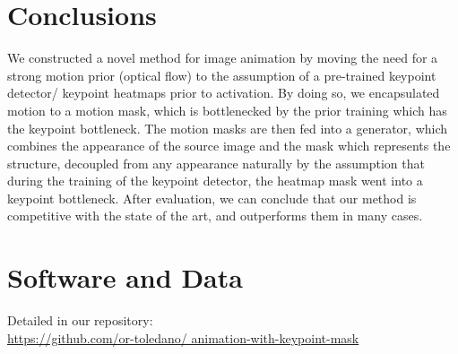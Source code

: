 \documentclass{article}
\begin{document}
\section{Conclusions}
We constructed a novel method for image animation by moving the need for
a strong motion prior (optical flow) to the assumption of a pre-trained
keypoint detector/ keypoint heatmaps prior to activation.
By doing so, we encapsulated motion to a motion mask, which is
bottlenecked by the prior training which has the keypoint bottleneck.
The motion masks are then fed into a generator, which combines the
appearance of the source image and the mask which represents the structure,
decoupled from any appearance naturally by the assumption that during the
training of the keypoint detector, the heatmap mask went into a keypoint
bottleneck. After evaluation, we can conclude that our method is
competitive with the state of the art, and outperforms them in many cases.
\section*{Software and Data}
Detailed in our repository:
\\
\url{https://github.com/or-toledano/
animation-with-keypoint-mask}


\end{document}
